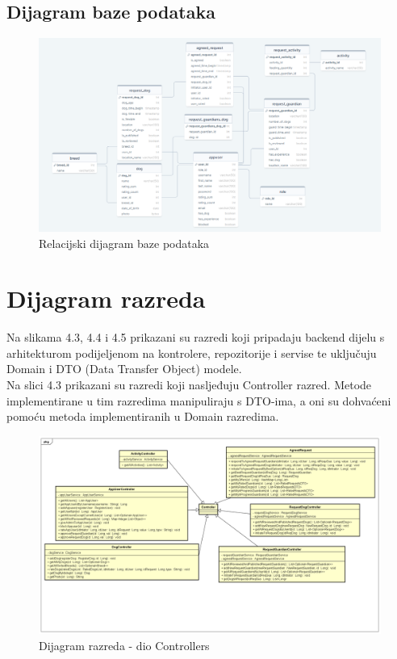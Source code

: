 			\eject
			\subsection{Dijagram baze podataka}
			
			\begin{figure}[htb]
				\centering
				\includegraphics[width=15cm]{slike/drawsql REL}
				\caption{Relacijski dijagram baze podataka} 
				\label{fig:E-Rdijagram}
			\end{figure}
			
			\eject
			
			
		\section{Dijagram razreda}
		
			Na slikama 4.3, 4.4 i 4.5 prikazani su razredi koji pripadaju backend dijelu s arhitekturom podijeljenom na kontrolere, repozitorije i servise te uključuju Domain i DTO (Data Transfer Object) modele.\\
			Na slici 4.3 prikazani su razredi koji nasljeđuju Controller razred. Metode implementirane u tim razredima manipuliraju s DTO-ima, a oni su dohvaćeni pomoću metoda implementiranih u Domain razredima.
			
			\begin{figure}[htb]
				\centering
				\includegraphics[width=15cm]{slike/Dijagram razreda - Controllers}
				\caption{Dijagram razreda - dio Controllers} 
				\label{fig:Class-Diagram}
			\end{figure}
		
